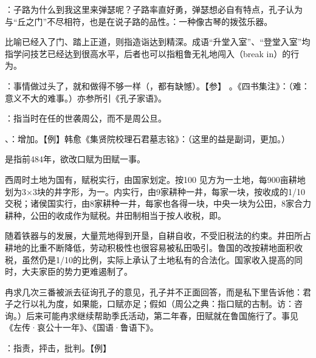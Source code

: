 {
\item {}：子路为什么到我这里来弹瑟呢？子路率直好勇，弹瑟想必自有特点，孔子认为与“丘之门”不尽相符，也是在说子路的品性。：一种像古琴的拨弦乐器。
\item {}比喻已经入了门、踏上正道，则指造诣达到精深。成语“升堂入室”、“登堂入室”均指学问技艺已经达到很高水平，后者也可以指粗鲁无礼地闯入（break in）的行为。
}
{}


{
\item {}：事情做过头了，就和做得不够一样（，都有缺憾）。【参】 。《四书集注》：（难：意义不大的难事。）亦参所引《孔子家语》。
}
{}  %


{
\item {}：指当时在任的世袭周公，而不是周公旦。
\item {}、：增加。【例】韩愈《集贤院校理石君墓志铭》：（这里的益是副词，更加。）

是指前484年，欲改口赋为田赋一事。

西周时土地为国有，赋税实行，由国家划定。按100 见方为一土地，每900亩耕地划为3×3块的井字形，为一。内实行，由9家耕种一井，每家一块，按收成的1/10交税；诸侯国实行，由8家耕种一井，每家也各得一块，中央一块为公田，8家合力耕种，公田的收成作为赋税。井田制相当于按人收税，即。

随着铁器与的发展，大量荒地得到开垦，自耕自收，不受旧税法的约束。井田所占耕地的比重不断降低，劳动积极性也很容易被私田吸引。鲁国的改按耕地面积收税，虽然仍是1/10的比例，实际上承认了土地私有的合法化。国家收入提高的同时，大夫家臣的势力更难遏制了。

冉求几次三番被派去征询孔子的意见，孔子并不正面回答，而是私下里告诉他：君子之行以礼为度，如果能，口赋亦足；假如（周公之典：指口赋的古制。访：咨询。）后来可能冉求继续帮助季氏活动，第二年春，田赋就在鲁国施行了。事见《左传·哀公十一年》、《国语·鲁语下》。

\item {}：指责，抨击，批判。【例】 
}
{}


